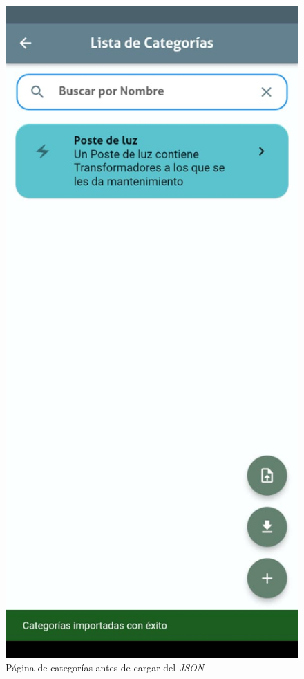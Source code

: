 \documentclass[12pt, a4paper]{book}
\begin{document}
\begin{figure}[H]
\begin{minipage}[b]{0.3\textwidth}
    \caption{Página de categorías antes de cargar del \textit{JSON}}
    \label{fig:loadcategories1}
  \end{minipage}
  \hspace{0.02\textwidth}
  \begin{minipage}[b]{0.3\textwidth}
    \centering
    \includegraphics[width=\textwidth]{images/functionality_test/load_categories_2.jpg}

\end{minipage}
\end{figure}
\end{document}

